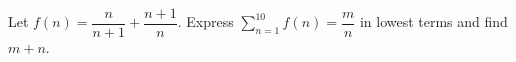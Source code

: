 Let $f(n)=\dfrac{n}{n+1}+\dfrac{n+1}{n}$. Express $\sum_{n=1}^{10}f(n)=\dfrac{m}{n}$ in lowest terms and find $m+n$.
